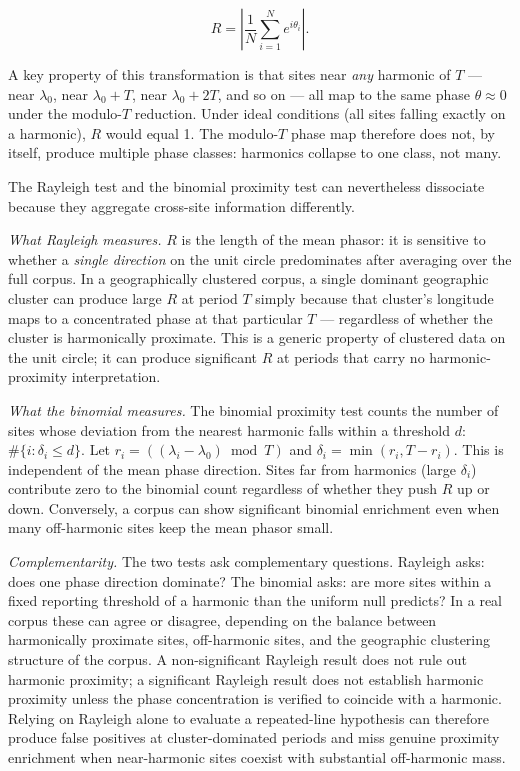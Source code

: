 \documentclass[12pt,a4paper]{article}
\begin{document}
\[
R = \left| \frac{1}{N} \sum_{i=1}^{N} e^{i\theta_i} \right|.
\]

A key property of this transformation is that sites near \emph{any}
harmonic of $T$ --- near $\lambda_0$, near $\lambda_0 + T$, near
$\lambda_0 + 2T$, and so on --- all map to the same phase $\theta \approx 0$
under the modulo-$T$ reduction. Under ideal conditions (all sites
falling exactly on a harmonic), $R$ would equal 1. The modulo-$T$
phase map therefore does not, by itself, produce multiple phase
classes: harmonics collapse to one class, not many.

The Rayleigh test and the binomial proximity test can nevertheless
dissociate because they aggregate cross-site information differently.

\emph{What Rayleigh measures.} $R$ is the length of the mean phasor: it
is sensitive to whether a \emph{single direction} on the unit circle
predominates after averaging over the full corpus. In a geographically
clustered corpus, a single dominant geographic cluster can produce
large $R$ at period $T$ simply because that cluster's longitude maps to
a concentrated phase at that particular $T$ --- regardless of whether
the cluster is harmonically proximate. This is a generic property of
clustered data on the unit circle; it can produce significant $R$ at
periods that carry no harmonic-proximity interpretation.

\emph{What the binomial measures.} The binomial proximity test counts
the number of sites whose deviation from the nearest harmonic falls
within a threshold $d$: $\#\{i : \delta_i \leq d\}$. Let
$r_i = ((\lambda_i - \lambda_0) \bmod T)$ and
$\delta_i = \min(r_i, T - r_i)$.
This is independent of the mean phase direction. Sites far from
harmonics (large $\delta_i$) contribute zero to the binomial count
regardless of whether they push $R$ up or down. Conversely, a corpus
can show significant binomial enrichment even when many off-harmonic
sites keep the mean phasor small.

\emph{Complementarity.} The two tests ask complementary questions.
Rayleigh asks: does one phase direction dominate? The binomial asks:
are more sites within a fixed reporting threshold of a harmonic than the
uniform null predicts? In a real corpus these can agree or disagree,
depending on the balance between harmonically proximate sites,
off-harmonic sites, and the geographic clustering structure of the
corpus. A non-significant Rayleigh result does not rule out harmonic
proximity; a significant Rayleigh result does not establish harmonic
proximity unless the phase concentration is verified to coincide with
a harmonic. Relying on Rayleigh alone to evaluate a repeated-line
hypothesis can therefore produce false positives at cluster-dominated
periods and miss genuine proximity enrichment when near-harmonic sites
coexist with substantial off-harmonic mass.
\end{document}
